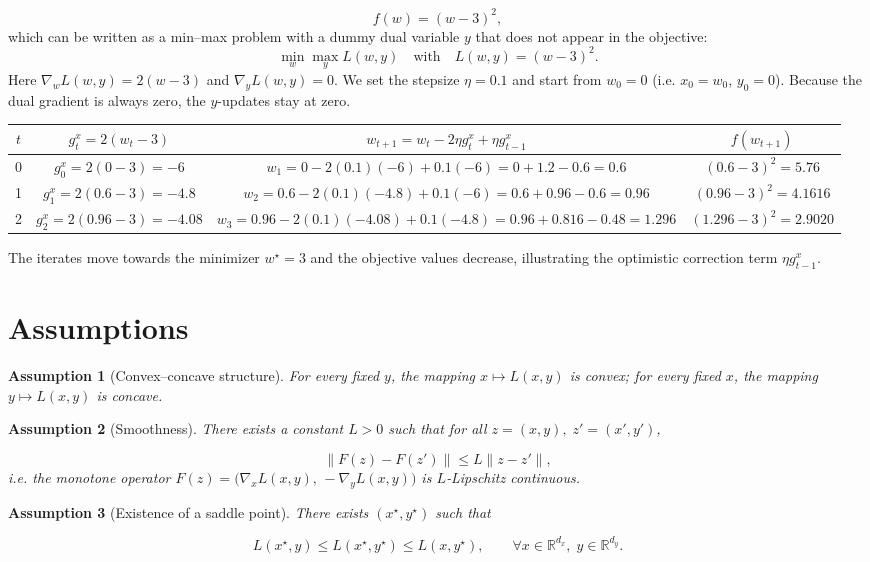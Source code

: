 \documentclass{article}
\newtheorem{assumption}{Assumption}
\begin{document}
\[
f(w)=(w-3)^2,
\]
which can be written as a min–max problem with a dummy dual variable \(y\) that does not appear in the objective:
\[
\min_{w}\max_{y} L(w,y)\quad\text{with}\quad L(w,y)= (w-3)^2 .
\]
Here \(\nabla_w L(w,y)=2(w-3)\) and \(\nabla_y L(w,y)=0\).  
We set the stepsize \(\eta=0.1\) and start from \(w_0=0\) (i.e. \(x_0=w_0\), \(y_0=0\)).  
Because the dual gradient is always zero, the \(y\)-updates stay at zero.

\bigskip
\begin{center}
\begin{tabular}{c|c|c|c}
$t$ & $g^{x}_{t}=2(w_t-3)$ & $w_{t+1}=w_t-2\eta g^{x}_{t}+\eta g^{x}_{t-1}$ & $f(w_{t+1})$\\ \hline
0 & $g^{x}_{0}=2(0-3)=-6$ & $w_{1}=0-2(0.1)(-6)+0.1(-6)=0+1.2-0.6=0.6$ & $(0.6-3)^2=5.76$\\[0.2cm]
1 & $g^{x}_{1}=2(0.6-3)=-4.8$ & $w_{2}=0.6-2(0.1)(-4.8)+0.1(-6)=0.6+0.96-0.6=0.96$ & $(0.96-3)^2=4.1616$\\[0.2cm]
2 & $g^{x}_{2}=2(0.96-3)=-4.08$ & $w_{3}=0.96-2(0.1)(-4.08)+0.1(-4.8)=0.96+0.816-0.48=1.296$ & $(1.296-3)^2=2.9020$\\
\end{tabular}
\end{center}
The iterates move towards the minimizer \(w^{\star}=3\) and the objective values decrease, illustrating the optimistic correction term \(\eta g^{x}_{t-1}\).

\section{Assumptions}
\label{sec:assumptions}
\begin{assumption}[Convex–concave structure]\label{ass:convexconcave}
For every fixed \(y\), the mapping \(x\mapsto L(x,y)\) is convex; for every fixed \(x\), the mapping \(y\mapsto L(x,y)\) is concave.
\end{assumption}

\begin{assumption}[Smoothness]\label{ass:smooth}
There exists a constant \(L>0\) such that for all \(z=(x,y),\;z'=(x',y')\),

\[
\|F(z)-F(z')\|\le L\|z-z'\|,
\]
i.e. the monotone operator \(F(z)=\bigl(\nabla_x L(x,y),\,-\nabla_y L(x,y)\bigr)\) is $L$‑Lipschitz continuous.
\end{assumption}

\begin{assumption}[Existence of a saddle point]\label{ass:saddle}
There exists \((x^{\star},y^{\star})\) such that  

\[
L(x^{\star},y)\le L(x^{\star},y^{\star})\le L(x,y^{\star}),\qquad\forall x\in\mathbb{R}^{d_x},\; y\in\mathbb{R}^{d_y}.
\]
\end{assumption}
\end{document}
